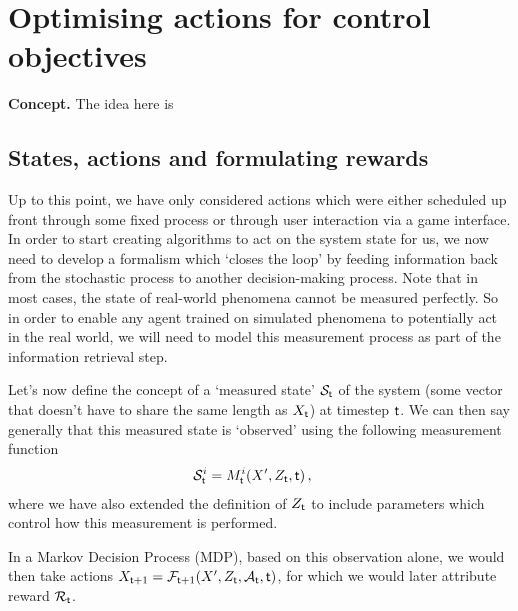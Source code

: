 \chapter{\sffamily Optimising actions for control objectives}

{\bfseries\sffamily Concept.} The idea here is 

\section{\sffamily States, actions and formulating rewards}

Up to this point, we have only considered actions which were either scheduled up front through some fixed process or through user interaction via a game interface. In order to start creating algorithms to act on the system state for us, we now need to develop a formalism which `closes the loop' by feeding information back from the stochastic process to another decision-making process. Note that in most cases, the state of real-world phenomena cannot be measured perfectly. So in order to enable any agent trained on simulated phenomena to potentially act in the real world, we will need to model this measurement process as part of the information retrieval step.

Let's now define the concept of a `measured state' ${\cal S}_{{\sf t}}$ of the system (some vector that doesn't have to share the same length as $X_{\sf t}$) at timestep ${\sf t}$. We can then say generally that this measured state is `observed' using the following measurement function
\begin{align}
{\cal S}_{{\sf t}}^i &= M_{{\sf t}}^i(X', Z_{\sf t}, {\sf t}) \label{eq:generalised-state-measurement} \,,
\end{align}
where we have also extended the definition of $Z_{\sf t}$ to include parameters which control how this measurement is performed.

In a Markov Decision Process (MDP), based on this observation alone, we would then take actions $X_{{\sf t}+1} = {\cal F}_{{\sf t}+1}(X',Z_{\sf t},{\cal A}_{\sf t},{\sf t})$, for which we would later attribute reward ${\cal R}_{{\sf t}}$.